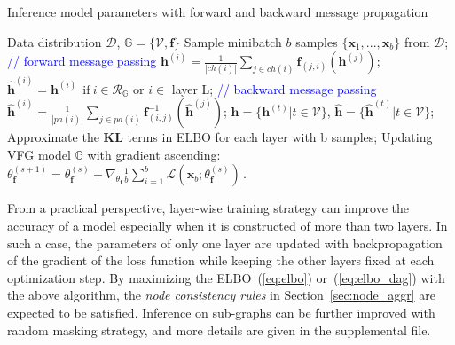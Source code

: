\documentclass[sigconf, anonymous, review]{acmart}
\theoremstyle{plain}
\theoremstyle{definition}
\theoremstyle{remark}
\begin{document}
\begin{algorithm}[h]
   \caption{Inference model parameters with  forward and backward message propagation}
   \label{alg:main}
\begin{algorithmic}[1]
    Data distribution $\mathcal{D}$,  $\mathbb{G} = \{\mathcal{V}, \mathbf{f}\}$
   \STATE  Sample minibatch $b$ samples $\{\mathbf{x}_1, ..., \mathbf{x}_b \}$ from $\mathcal{D}$;
   \label{line:for2}
    \STATE  \textcolor{blue}{// forward message passing}
   \STATE $\mathbf{h}^{(i)} = \frac{1}{|ch(i)|} \sum_{j \in ch(i) } \mathbf{f}_{(j,i)}(\mathbf{h}^{(j)})$; \label{line:forward} 
    \ENDFOR
    \STATE $\widehat{\mathbf{h}}^{(i)} = \mathbf{h}^{(i)} \ \  \text{if} \ i \in \mathcal{R}_{\mathbb{G}} $ or $i \in$ layer L;
   \STATE \textcolor{blue}{// backward message passing}
   \STATE $\widehat{\mathbf{h}}^{(i)} = \frac{1}{|pa(i)|} \sum_{j \in pa(i) } \mathbf{f}^{-1}_{ (i,j)}(\widehat{\mathbf{h}}^{(j)}) $;\label{line:backward}  
   \ENDFOR
    \STATE  $\mathbf{h} =  \{\mathbf{h}^{(t)} \big |  t \in \mathcal{V} \}$, $\widehat{\mathbf{h}} =  \{\widehat{\mathbf{h}}^{(t)} \big | t \in \mathcal{V} \}$;
    \STATE Approximate the $\mathbf{KL}$ terms in ELBO for each layer with b samples;
    \STATE Updating VFG model $\mathbb{G}$ with gradient ascending: $\theta^{(s+1)}_{\mathbf{f}} = \theta^{(s)}_{\mathbf{f}} + \nabla_{\theta_{\mathbf{f}}}\frac{1}{b} \sum_{i=1}^b  \mathcal{L}(\mathbf{x}_b; \theta^{(s)}_{\mathbf{f}})   \, .$\label{line:update} 
   \ENDFOR
\end{algorithmic}
\end{algorithm}

From a practical perspective, layer-wise training strategy can improve the accuracy of a model especially when it is constructed of more than two layers. 
In such a case, the parameters of only one layer are updated with backpropagation of the gradient of the loss function while keeping the other layers fixed at each optimization step. 
By maximizing the ELBO~(\ref{eq:elbo}) or~(\ref{eq:elbo_dag}) with the above algorithm, the \emph{node consistency rules} in Section~\ref{sec:node_aggr} are expected to be satisfied. 
Inference on sub-graphs  can be further improved with random masking strategy, and more details are given in the supplemental file. 
\end{document}
